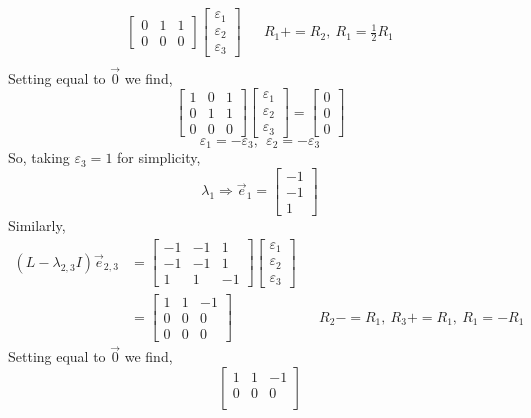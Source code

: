 \documentclass[letterpaper,10pt]{article}
\begin{document}
\begin{description}
\begin{align*}
\begin{bmatrix}
0 & 1 & 1\\
0 & 0 & 0
\end{bmatrix}\begin{bmatrix}
\varepsilon_1\\
\varepsilon_2\\
\varepsilon_3
\end{bmatrix} && R_1+=R_2,\ R_1=\frac{1}{2}R_1\\
\end{align*}
Setting equal to $\vec{0}$ we find,
\[\begin{bmatrix}
1 & 0 & 1\\
0 & 1 & 1\\
0 & 0 & 0
\end{bmatrix}\begin{bmatrix}
\varepsilon_1\\
\varepsilon_2\\
\varepsilon_3
\end{bmatrix}=\begin{bmatrix}
0\\
0\\
0
\end{bmatrix}\]
\[\varepsilon_1=-\varepsilon_3,\ \ \varepsilon_2=-\varepsilon_3\]
So, taking $\varepsilon_3=1$ for simplicity,
\[\lambda_1 \Rightarrow \vec{e}_1=\begin{bmatrix}
-1 \\
-1\\
1
\end{bmatrix}\]
Similarly,
\begin{align*}
(L-\lambda_{2,3}I)\vec{e}_{2,3}&=\begin{bmatrix}
-1 & -1 & 1\\
-1 & -1 & 1\\
1 & 1 & -1
\end{bmatrix}\begin{bmatrix}
\varepsilon_1\\
\varepsilon_2\\
\varepsilon_3
\end{bmatrix}\\
&=\begin{bmatrix}
1 & 1 & -1 \\
0 & 0 & 0 \\
0 & 0 & 0
\end{bmatrix} && R_2-=R_1,\ R_3+=R_1,\ R_1=-R_1
\end{align*}
Setting equal to $\vec{0}$ we find,
\[\begin{bmatrix}
1 & 1 & -1\\
0 & 0 & 0\\

\end{bmatrix}\]
\end{description}
\end{document}
